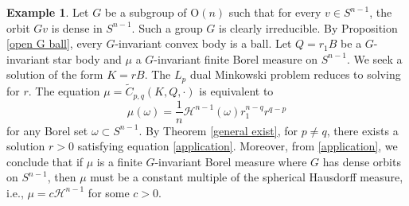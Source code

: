 \documentclass[12pt, reqno]{amsart}
\theoremstyle{definition}
\newtheorem{example}[theorem]{Example}
\theoremstyle{remark}
\numberwithin{equation}{section}
\newcommand{\Sn}{S^{n-1}}
\newcommand{\On}{\mathrm{O}(n)}
\begin{document}
	\begin{example}
	Let $G$ be a subgroup of $\On$	such that for every $v \in \Sn$, the orbit $Gv$ is dense in $\Sn$. 
	Such a group $G$ is clearly irreducible. By Proposition \ref{open G ball}, every $G$-invariant convex body is a ball.  Let $Q = r_1 B$ be a $G$-invariant star body and $\mu$ a $G$-invariant finite Borel measure on $\Sn$. We seek a solution of the form $K = rB$. The $L_{p}$ dual Minkowski problem reduces to solving for  $r$. The equation $\mu = \widetilde{C}_{p,q}(K, Q, \cdot)$ is equivalent to
	\begin{equation}\label{application}
	\mu(\omega)=\frac{1}{n}\mathcal{H}^{n-1}(\omega)r_{1}^{n-q}r^{q-p}
\end{equation}
for any Borel set $\omega\subset \Sn$.	By Theorem \ref{general exist}, for $p\neq q$,  there exists a solution $r > 0$ satisfying equation \eqref{application}.   Moreover, from \eqref{application}, we conclude  that if $\mu$ is a finite $G$-invariant Borel measure where $G$ has dense orbits on $\Sn$, then $\mu$ must be a constant multiple of the spherical Hausdorff measure, i.e., $\mu = c \mathcal{H}^{n-1}$ for some $c > 0$.
	\end{example}
	
	
	
		
		
\end{document}
